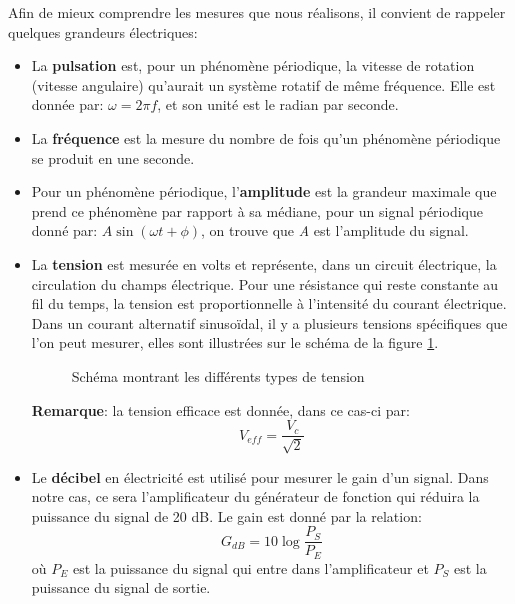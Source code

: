 \documentclass[a4paper]{article}
\begin{document}
Afin de mieux comprendre les mesures que nous réalisons, il convient de rappeler quelques grandeurs électriques:
\begin{itemize}
    \item La \textbf{pulsation} est, pour un phénomène périodique, la vitesse de rotation (vitesse angulaire) qu'aurait un système rotatif de même fréquence. Elle est donnée par: $ \omega = 2 \pi f $, et son unité est le radian par seconde.
    \item La \textbf{fréquence} est la mesure du nombre de fois qu'un phénomène périodique se produit en une seconde.
    \item Pour un phénomène périodique, l'\textbf{amplitude} est la grandeur maximale que prend ce phénomène par rapport à sa médiane, pour un signal périodique donné par: $ A \sin (\omega t + \phi) $, on trouve que \textit{A} est l'amplitude du signal.
    \item La \textbf{tension} est mesurée en volts et représente, dans un circuit électrique, la circulation du champs électrique. Pour une résistance qui reste constante au fil du temps, la tension est proportionnelle à l'intensité du courant électrique. \\
    Dans un courant alternatif sinusoïdal, il y a plusieurs tensions spécifiques que l'on peut mesurer, elles sont illustrées sur le schéma de la figure \ref{fig:differentsTension}.

    \begin{figure}%
      \centering
      \caption{Schéma montrant les différents types de tension}
      \label{fig:differentsTension}
    \end{figure}
    \textbf{Remarque}: la tension efficace est donnée, dans ce cas-ci par:
    \[ V_{eff} = \frac{V_c}{\sqrt{2}} \]
    \item Le \textbf{décibel} en électricité est utilisé pour mesurer le gain d'un signal. Dans notre cas, ce sera l'amplificateur du générateur de fonction qui réduira la puissance du signal de 20 dB. Le gain est donné par la relation:
    \[ G_{dB} = 10 \log \frac{P_S}{P_E} \]
    où $P_E$ est la puissance du signal qui entre dans l'amplificateur et $P_S$ est la puissance du signal de sortie.
\end{itemize}
\end{document}
